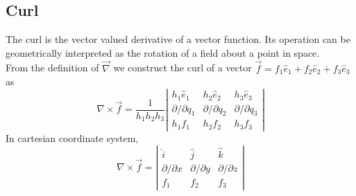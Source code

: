 	 

\subsection{Curl}
The curl is the vector valued derivative of a vector function. Its operation can be geometrically interpreted as the rotation of a field about a point in space.\\From the definition of $\vec{\nabla}$ we construct the curl of a vector $\vec{f}=f_1\hat{e}_{1}+f_2\hat{e}_{2}+f_3\hat{e}_{3}$ as
$$
\nabla \times \vec{f
}=\frac{1}{h_{1} h_{2} h_{3}}\left|\begin{array}{lll}
	h_{1} \hat{e}_{1} & h_{2} \hat{e}_{2} & h_{3} \hat{e}_{3} \\
	\partial / \partial q_{1} & \partial / \partial q_{2} & \partial / \partial q_{3} \\
	h_{1} f_{1} & h_{2} f_{2} & h_{3} f_{3}
\end{array}\right|
$$
In cartesian coordinate system,
$$
\nabla \times \vec{f
}=\left|\begin{array}{lll}
\hat{{i}} & \hat{{j}} & \hat{{k}} \\
\partial / \partial x & \partial / \partial y & \partial / \partial z \\
f_{1} & f_{2} & f _{3}
\end{array}\right|
$$

